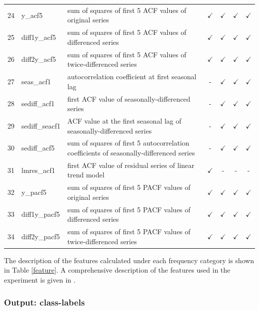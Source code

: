 \documentclass[11pt,a4paper,]{article}
\def\yes{$\checkmark$}
\theoremstyle{definition}
\theoremstyle{definition}
\theoremstyle{definition}
\theoremstyle{remark}
\begin{document}
\begin{table}[!htp]
\begin{tabular}{llp{}cccc}
24 & y\_acf5        & sum of squares of first 5 ACF values of original series                                 & \yes  & \yes & \yes & \yes\\
25 & diff1y\_acf5   & sum of squares of first 5 ACF values of differenced series                              & \yes  & \yes & \yes & \yes\\
26 & diff2y\_acf5   & sum of squares of first 5 ACF values of twice-differenced series                        & \yes  & \yes & \yes & \yes \\
27 & seas\_acf1     & autocorrelation coefficient at first seasonal lag                                       & -     & \yes & \yes & \yes\\
28 & sediff\_acf1   & first ACF value of seasonally-differenced series                                        & -     & \yes & \yes & \yes\\
29 & sediff\_seacf1 & ACF value at the first seasonal lag of seasonally-differenced series                    & -     & \yes & \yes & \yes\\
30 & sediff\_acf5   & sum of squares of first 5 autocorrelation coefficients of seasonally-differenced series & -     & \yes & \yes & \yes\\
31 & lmres\_acf1    & first ACF value of residual series of linear trend model                                & \yes  & - & - & -\\
32 & y\_pacf5       & sum of squares of first 5 PACF values of original series                                & \yes  & \yes & \yes & \yes\\
33 & diff1y\_pacf5  & sum of squares of first 5 PACF values of differenced series                             & \yes  & \yes & \yes & \yes\\
34 & diff2y\_pacf5  & sum of squares of first 5 PACF values of twice-differenced series                       & \yes  & \yes & \yes & \yes\\
\bottomrule
 \end{tabular}
\end{table}

The description of the features calculated under each frequency category
is shown in Table \ref{feature}. A comprehensive description of the
features used in the experiment is given in \textcite{fforms}.

\subsubsection{Output: class-labels}\label{output-class-labels}
\end{document}
